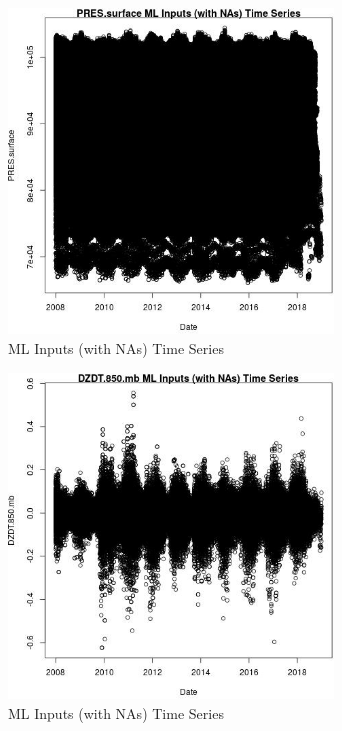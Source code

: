 \begin{figure} 
\centering  
\includegraphics[width=0.77\textwidth]{Code_Outputs/Report_ML_input_PM25_Step4_part_e_de_duplicated_aves_compiled_2019-05-21wNAs_PRESsurfacevDate.jpg} 
\caption{\label{fig:Report_ML_input_PM25_Step4_part_e_de_duplicated_aves_compiled_2019-05-21wNAsPRESsurfacevDate}ML Inputs (with NAs) Time Series} 
\end{figure} 
 

\begin{figure} 
\centering  
\includegraphics[width=0.77\textwidth]{Code_Outputs/Report_ML_input_PM25_Step4_part_e_de_duplicated_aves_compiled_2019-05-21wNAs_DZDT850mbvDate.jpg} 
\caption{\label{fig:Report_ML_input_PM25_Step4_part_e_de_duplicated_aves_compiled_2019-05-21wNAsDZDT850mbvDate}ML Inputs (with NAs) Time Series} 
\end{figure} 
 

